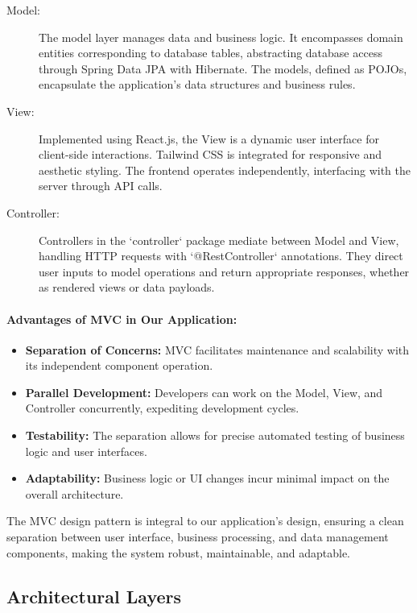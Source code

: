 \begin{description}
  \item[Model:] The model layer manages data and business logic. It encompasses domain entities corresponding to database tables, abstracting database access through Spring Data JPA with Hibernate. The models, defined as POJOs, encapsulate the application's data structures and business rules.
  
  \item[View:] Implemented using React.js, the View is a dynamic user interface for client-side interactions. Tailwind CSS is integrated for responsive and aesthetic styling. The frontend operates independently, interfacing with the server through API calls.
  
  \item[Controller:] Controllers in the `controller` package mediate between Model and View, handling HTTP requests with `@RestController` annotations. They direct user inputs to model operations and return appropriate responses, whether as rendered views or data payloads.
\end{description}

\paragraph{Advantages of MVC in Our Application:}
\begin{itemize}
  \item \textbf{Separation of Concerns:} MVC facilitates maintenance and scalability with its independent component operation.
  \item \textbf{Parallel Development:} Developers can work on the Model, View, and Controller concurrently, expediting development cycles.
  \item \textbf{Testability:} The separation allows for precise automated testing of business logic and user interfaces.
  \item \textbf{Adaptability:} Business logic or UI changes incur minimal impact on the overall architecture.
\end{itemize}

The MVC design pattern is integral to our application's design, ensuring a clean separation between user interface, business processing, and data management components, making the system robust, maintainable, and adaptable.


\subsection{Architectural Layers}
